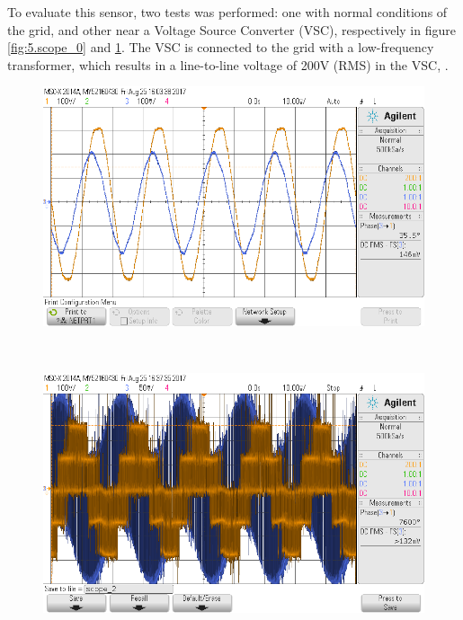 	
	To evaluate this sensor, two tests was performed: one with normal conditions of the grid, and other near a Voltage Source Converter (VSC), respectively in figure \ref{fig:5.scope_0} and \ref{fig:5.scope_2}. 
	The VSC is connected to the grid with a low-frequency transformer, which results in a line-to-line voltage of 200V (RMS) in the VSC, \cite{martins2016}.
	
		\begin{figure}[h!]
		\centering
		\begin{minipage}{.45\textwidth}
			\centering
			\includegraphics[width=\textwidth,keepaspectratio]{figures/5.PreliminaryW/scope_0}
			\label{fig:5.scope_0}
		\end{minipage}%
		\begin{minipage}{.03\textwidth}  ~\end{minipage}	
		\begin{minipage}{.45\textwidth}
			\centering
			\includegraphics[width=\textwidth,keepaspectratio]{figures/5.PreliminaryW/scope_2}
			\label{fig:5.scope_2}
		\end{minipage}
	\end{figure}

